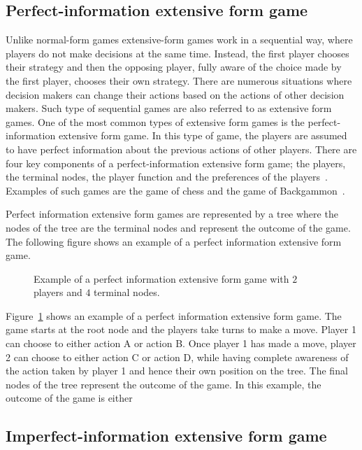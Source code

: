 \subsection{Perfect-information extensive form game}

Unlike normal-form games extensive-form games work in a sequential way, where
players do not make decisions at the same time.
Instead, the first player chooses their strategy and then the opposing player,
fully aware of the choice made by the first player, chooses their own strategy.
There are numerous situations where decision makers can change their actions
based on the actions of other decision makers.
Such type of sequential games are also referred to as extensive form games.
One of the most common types of extensive form games is the perfect-information
extensive form game.
In this type of game, the players are assumed to have perfect information
about the previous actions of other
players.
There are four key components of a perfect-information extensive form game; the
players, the terminal nodes, the player function and the preferences of the
players~\cite{osborne2004_extensive_form_games}.
Examples of such games are the game of chess and the game of
Backgammon~\cite{hart1992games}.

Perfect information extensive form games are represented by a tree where the
nodes of the tree are the terminal nodes and represent the outcome of the
game.
The following figure shows an example of a perfect information extensive form
game.

\begin{figure}[H]
    \centering
    
    \caption{Example of a perfect information extensive form game with \(2\)
    players and \(4\) terminal nodes.}
    \label{fig:extensive_form_game}
\end{figure}

Figure~\ref{fig:extensive_form_game} shows an example of a perfect information
extensive form game.
The game starts at the root node and the players take turns to make a move.
Player 1 can choose to either action A or action B.
Once player 1 has made a move, player 2 can choose to either action C or action
D, while having complete awareness of the action taken by player 1 and hence
their own position on the tree.
The final nodes of the tree represent the outcome of the game.
In this example, the outcome of the game is either 

\subsection{Imperfect-information extensive form game}
\label{sec:game_imperfect_information}

